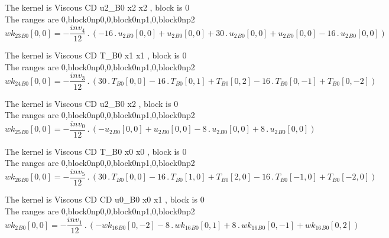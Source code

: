 \documentclass{article}
\begin{document}
\noindent The kernel is Viscous CD u2_B0 x2 x2 , block is 0\\\noindent The ranges are 0,block0np0,0,block0np1,0,block0np2\\\begin{dmath}{wk_{23}{_{B0}}}[{0,0}] = - \frac{inv_4}{12} \,.\, \left(- 16 \,.\, {u_{2}{_{B0}}}[{0,0}] + {u_{2}{_{B0}}}[{0,0}] + 30 \,.\, {u_{2}{_{B0}}}[{0,0}] + {u_{2}{_{B0}}}[{0,0}] - 16 \,.\, {u_{2}{_{B0}}}[{0,0}]\right)\end{dmath}

\noindent The kernel is Viscous CD T_B0 x1 x1 , block is 0\\\noindent The ranges are 0,block0np0,0,block0np1,0,block0np2\\\begin{dmath}{wk_{24}{_{B0}}}[{0,0}] = - \frac{inv_3}{12} \,.\, \left(30 \,.\, {T{_{B0}}}[{0,0}] - 16 \,.\, {T{_{B0}}}[{0,1}] + {T{_{B0}}}[{0,2}] - 16 \,.\, {T{_{B0}}}[{0,-1}] + {T{_{B0}}}[{0,-2}]\right)\end{dmath}

\noindent The kernel is Viscous CD u2_B0 x2 , block is 0\\\noindent The ranges are 0,block0np0,0,block0np1,0,block0np2\\\begin{dmath}{wk_{25}{_{B0}}}[{0,0}] = - \frac{inv_0}{12} \,.\, \left(- {u_{2}{_{B0}}}[{0,0}] + {u_{2}{_{B0}}}[{0,0}] - 8 \,.\, {u_{2}{_{B0}}}[{0,0}] + 8 \,.\, {u_{2}{_{B0}}}[{0,0}]\right)\end{dmath}

\noindent The kernel is Viscous CD T_B0 x0 x0 , block is 0\\\noindent The ranges are 0,block0np0,0,block0np1,0,block0np2\\\begin{dmath}{wk_{26}{_{B0}}}[{0,0}] = - \frac{inv_5}{12} \,.\, \left(30 \,.\, {T{_{B0}}}[{0,0}] - 16 \,.\, {T{_{B0}}}[{1,0}] + {T{_{B0}}}[{2,0}] - 16 \,.\, {T{_{B0}}}[{-1,0}] + {T{_{B0}}}[{-2,0}]\right)\end{dmath}

\noindent The kernel is Viscous CD CD u0_B0 x0 x1 , block is 0\\\noindent The ranges are 0,block0np0,0,block0np1,0,block0np2\\\begin{dmath}{wk_{2}{_{B0}}}[{0,0}] = - \frac{inv_1}{12} \,.\, \left(- {wk_{16}{_{B0}}}[{0,-2}] - 8 \,.\, {wk_{16}{_{B0}}}[{0,1}] + 8 \,.\, {wk_{16}{_{B0}}}[{0,-1}] + {wk_{16}{_{B0}}}[{0,2}]\right)\end{dmath}
\end{document}
